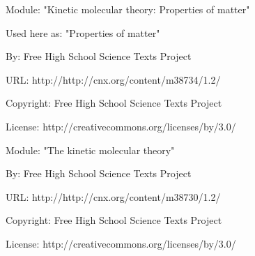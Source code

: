       \par\vspace{9pt}\noindent\begin{minipage}{\textwidth}
      Module: "Kinetic molecular theory: Properties of matter" \par\nopagebreak\noindent
      Used here as: "Properties of matter" \par\nopagebreak\noindent
        By: Free High School Science Texts Project\par\nopagebreak\noindent
      URL: http://http://cnx.org/content/m38734/1.2/\par\nopagebreak\noindent
      \par\nopagebreak\noindent
      Copyright: Free High School Science Texts Project\par\nopagebreak\noindent
      License:  http://creativecommons.org/licenses/by/3.0/\par\nopagebreak\noindent
      \par\end{minipage}
      \par\vspace{9pt}\noindent\begin{minipage}{\textwidth}
      Module: "The kinetic molecular theory" \par\nopagebreak\noindent
      By: Free High School Science Texts Project\par\nopagebreak\noindent
      URL: http://http://cnx.org/content/m38730/1.2/\par\nopagebreak\noindent
      \par\nopagebreak\noindent
      Copyright: Free High School Science Texts Project\par\nopagebreak\noindent
      License:  http://creativecommons.org/licenses/by/3.0/\par\nopagebreak\noindent
      \par\end{minipage}
